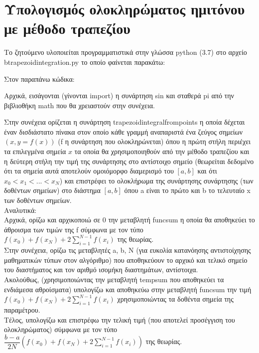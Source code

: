 \documentclass[a4paper,11pt]{article}
\newcommand{\lt}{\latintext}
\newcommand{\gt}{\greektext}
\begin{document}
\section{Υπολογισμός ολοκληρώματος ημιτόνου με μέθοδο τραπεζίου}
Το ζητούμενο υλοποιείται προγραμματιστικά στην γλώσσα {\lt python} (3.7) στο αρχείο {\lt b\textunderscore trapezoid\textunderscore integration.py} το οποίο φαίνεται παρακάτω:\\

\lt

\gt

\par
Στον παραπάνω κώδικα:\\
\par
Αρχικά, εισάγονται (γίνονται {\lt import}) η συνάρτηση {\lt sin} και σταθερά {\lt pi} από την βιβλιοθήκη {\lt math} που θα χρειαστούν στην συνέχεια.\\
\par
Στην συνέχεια ορίζεται η συνάρτηση {\lt trapezoid\textunderscore integral\textunderscore from\textunderscore points} η οποία δέχεται έναν δισδιάστατο πίνακα στον οποίο κάθε γραμμή αναπαριστά ένα ζεύγος σημείων {\lt $(x, y = f(x))$} ({\lt f} η συνάρτηση που ολοκληρώνεται) όπου η πρώτη στήλη περιέχει τα επιλεγμένα σημεία {\lt $x$} τα οποία θα χρησιμοποιηθούν από την μέθοδο τραπεζίου και η δεύτερη στήλη την τιμή της συνάρτησης στο αντίστοιχο σημείο (θεωρείται δεδομένο ότι τα σημεία αυτά αποτελούν ομοιόμορφο διαμερισμό του {\lt $[a, b]$} και  ότι $x_0 < x_1 < ... < x_N$) και επιστρέφει το ολοκλήρωμα της συνάρτησης συνάρτησης (των δοθέντων σημείων) στο διάστημα {\lt $[a, b]$} όπου {\lt a} είναι το πρώτο και {\lt b} το τελευταίο {\lt x} των δοθέντων σημείων.\\
Αναλυτικά:\\
Αρχικά, ορίζω και αρχικοποιώ σε 0 την μεταβλητή {\lt func\textunderscore sum} η οποία θα αποθηκεύει το άθροισμα των τιμών της {\lt f} σύμφωνα με τον τύπο {\lt $f(x_0) + f(x_N) + 2\sum_{i=1}^{N-1}f(x_{i})$} της θεωρίας.\\
Στην συνέχεια, ορίζω τις μεταβλητές {\lt a, b, N} (για ευκολία κατανόησης αντιστοίχησης μαθηματικών τύπων στον αλγόριθμο) που αποθηκεύουν το αρχικό και τελικό σημείο του διαστήματος και τον αριθμό ισομήκη διαστημάτων, αντίστοιχα.\\
Ακολούθως, (χρησιμοποιώντας την μεταβλητή {\lt temp\textunderscore sum} που αποθηκεύει τα ενδιάμεσα αθροίσματα) υπολογίζω και αποθηκεύω στην μεταβλητή {\lt func\textunderscore sum} την τιμή {\lt $f(x_0) + f(x_N) + 2\sum_{i=1}^{N-1}f(x_{i})$} χρησιμοποιώντας τα δοθέντα σημεία της παραμέτρου.\\
Τέλος, υπολογίζω και επιστρέφω την τελική τιμή (που αποτελεί προσέγγιση του ολοκληρώματος) σύμφωνα με τον τύπο {\lt $\dfrac{b-a}{2N}(f(x_0) + f(x_N) + 2\sum_{i=1}^{N-1}f(x_{i}))$} της θεωρίας.\\
\end{document}
